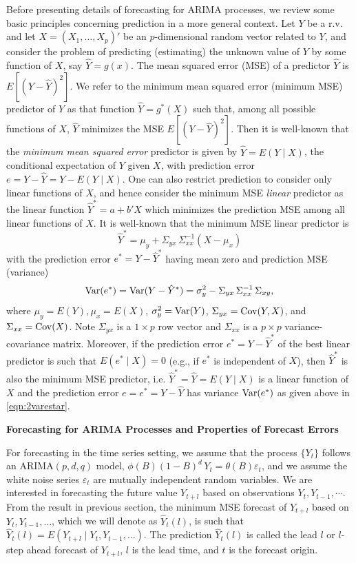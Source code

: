 Before presenting details of forecasting for ARIMA processes, we review some basic principles concerning prediction in a more general context. Let $Y$ be a r.v. and let $X = (X_1, \ldots, X_p)'$ be an $p$-dimensional random vector related to $Y$, and consider the problem of predicting (estimating) the unknown value of $Y$ by some function of $X$, say $\hat{Y} = g(x)$. The mean squared error (MSE) of a predictor $\hat{Y}$ is $E[(Y - \hat{Y})^2]$. We refer to the minimum mean squared error (minimum MSE) predictor of $Y$ as that function $\hat{Y} = g^*(X)$ such that, among all possible functions of $X$, $\hat{Y}$ minimizes the MSE $E[(Y - \hat{Y})^2]$. Then it is well-known that the \emph{minimum mean squared error} predictor is given by $\hat{Y} = E(Y\;|\;X)$, the conditional expectation of $Y$ given $X$, with prediction error $e = Y - \hat{Y} = Y - E(Y\;|\;X)$. One can also restrict prediction to consider only linear functions of $X$, and hence consider the minimum MSE \emph{linear} predictor as the linear function $\hat{Y}^* = a + b' X$ which minimizes the prediction MSE among all linear functions of $X$. It is well-known that the minimum MSE linear predictor is
	\begin{equation} \label{eqn:2yhatstar}
	\hat{Y}^* = \mu_y + \Sigma_{yx}\,\Sigma_{xx}^{-1}(X - \mu_x)
	\end{equation}
with the prediction error $e^* = Y - \hat{Y}^*$ having mean zero and prediction MSE (variance)
	\begin{equation} \label{eqn:2varestar}
	\var(e^*) = \var(Y - \hat{Y}^*) = \sigma_y^2 - \Sigma_{yx}\,\Sigma_{xx}^{-1}\,\Sigma_{xy},
	\end{equation}
where $\mu_y = E(Y), \mu_x = E(X)$, $\sigma_y^2 = \operatorname{Var}(Y)$, $\Sigma_{yx} = \operatorname{Cov}(Y,X)$, and $\Sigma_{xx} = \operatorname{Cov}(X)$. Note $\Sigma_{yx}$ is a $1 \times p$ row vector and $\Sigma_{xx}$ is a $p \times p$ variance-covariance matrix. Moreover, if the prediction error $e^* = Y - \hat{Y}^*$ of the best linear predictor is such that $E(e^*\;|\;X) = 0$ (e.g., if $e^*$ is independent of $X$), then $\hat{Y}^*$ is also the minimum MSE predictor, i.e. $\hat{Y}^* = \hat{Y} = E(Y\;|\;X)$ is a linear function of $X$ and the prediction error $e = e^* = Y - \hat{Y}$ has variance $\operatorname{Var}(e^*)$ as given above in \eqref{eqn:2varestar}. \twomedskip


\noindent\textbf{Forecasting for ARIMA Processes and Properties of Forecast Errors} \twomedskip


For forecasting in the time series setting, we assume that the process $\{ Y_t \}$ follows an ARIMA$(p,d,q)$ model, $\phi(B)(1 - B)^d\,  Y_t = \theta(B) \varepsilon_t$, and we assume the white noise series $\varepsilon_t$ are mutually independent random variables. We are interested in forecasting the future value $Y_{t+l}$ based on observations $Y_t,Y_{t-1},\cdots$. From the result in previous section, the minimum MSE forecast of $Y_{t+l}$ based on $Y_t, Y_{t-1}, \ldots$, which we will denote as $\hat{Y}_t(l)$, is such that $\hat{Y}_t(l) = E(Y_{t+l} \;|\; Y_t,Y_{t-1},\ldots)$. The prediction $\hat{Y}_t(l)$ is called the lead $l$ or $l$-step ahead forecast of $Y_{t+l}$, $l$ is the lead time, and $t$ is the forecast origin.


